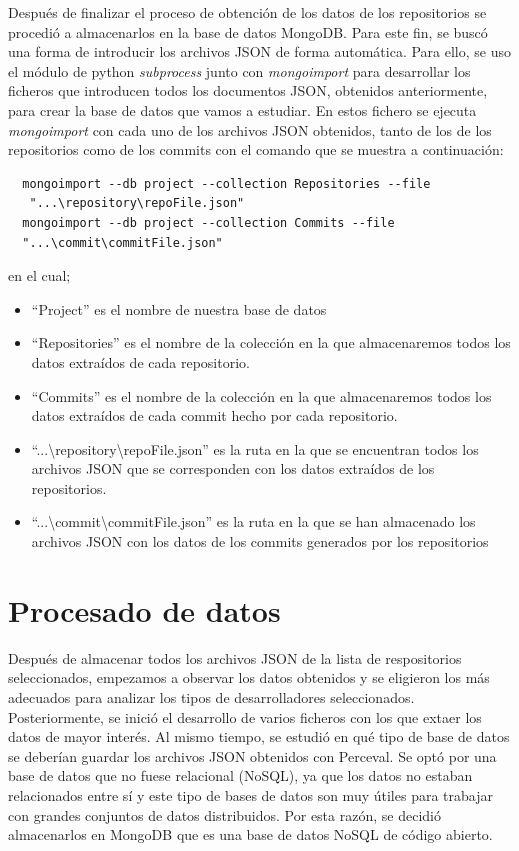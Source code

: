 \documentclass[a4paper, 12pt]{book}
\begin{document}
Después de finalizar el proceso de obtención de los datos de los repositorios se procedió a almacenarlos en la base de datos MongoDB.
Para este fin, se buscó una forma de introducir los archivos JSON de forma automática. 
Para ello, se uso el módulo de python \emph{subprocess} junto con \emph{mongoimport} para desarrollar los ficheros que introducen todos los documentos JSON, obtenidos anteriormente, para crear la base de datos que vamos a estudiar.
En estos fichero se ejecuta \emph{mongoimport} con cada uno de los archivos JSON obtenidos, tanto de los de los repositorios como de los commits con el comando que se muestra a continuación:
\begin{verbatim}
  mongoimport --db project --collection Repositories --file
   "...\repository\repoFile.json"
  mongoimport --db project --collection Commits --file 
  "...\commit\commitFile.json"
\end{verbatim}


en el cual;
\begin{itemize}
  \item ``Project'' es el nombre de nuestra base de datos
  \item ``Repositories'' es el nombre de la colección en la que almacenaremos todos los datos extraídos de cada repositorio.
  \item ``Commits'' es el nombre de la colección en la que almacenaremos todos los datos extraídos de cada commit hecho por cada repositorio.
  \item ``...\textbackslash repository\textbackslash repoFile.json'' es la ruta en la que se encuentran todos los archivos JSON que se corresponden con los datos extraídos de los repositorios.
  \item  ``...\textbackslash commit\textbackslash commitFile.json'' es la ruta en la que se han almacenado los archivos JSON con los datos de los commits generados por los repositorios
\end{itemize}

\section{Procesado de datos} %
\label{sec:procesado de datos}

Después de almacenar todos los archivos JSON de la lista de respositorios seleccionados, empezamos a observar los datos obtenidos y se eligieron los más adecuados para analizar los tipos de desarrolladores seleccionados. 
Posteriormente, se inició el desarrollo de varios ficheros con los que extaer los datos de mayor interés. 
Al mismo tiempo, se estudió en qué tipo de base de datos se deberían guardar los archivos JSON obtenidos con Perceval.
Se optó por una base de datos que no fuese relacional (NoSQL), ya que los datos no estaban relacionados entre sí y este tipo de bases de datos son muy útiles para trabajar con grandes conjuntos de datos distribuidos.
Por esta razón, se decidió almacenarlos en MongoDB que es una base de datos NoSQL de código abierto. 
\end{document}

